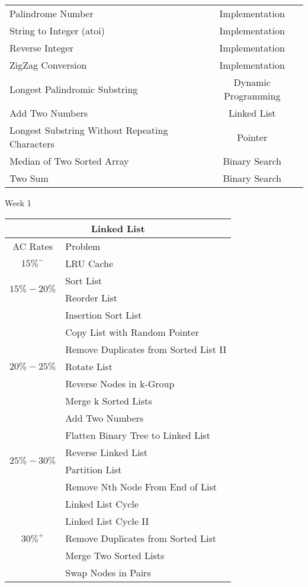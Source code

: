\documentclass[paper=a4, fontsize=11pt]{scrartcl} %
\begin{document}
\begin{center}
\begin{longtable}{|l|c|}
    Palindrome Number   &   Implementation \\
    String to Integer (atoi)    &   Implementation  \\
    Reverse Integer &   Implementation \\
    ZigZag Conversion   &  Implementation  \\
    Longest Palindromic Substring   &   Dynamic Programming \\
    Add Two Numbers &   Linked List \\
    Longest Substring Without Repeating Characters  &   Pointer  \\
    Median of Two Sorted Array  &   Binary Search   \\
    Two Sum &      Binary Search    \\
    \hline

  \end{longtable}

  \pagebreak

  \begin{center}
    Week 1
  \end{center}
  \vspace{5mm}

  \begin{tabular}{|c|l|}
      \hline
      \multicolumn{2}{|c|}{Linked List} \\
      \hline
      AC Rates      &   Problem     \\
      \hline
      \multirow{1}{*}{$15\%^-$}  &   LRU Cache    \\
      \hline
      \multirow{2}{*}{$15\%-20\%$}  &   Sort List    \\
          & Reorder List    \\
      \hline
      \multirow{7}{*}{$20\%-25\%$}  &   Insertion Sort List    \\
          & Copy List with Random Pointer    \\
          & Remove Duplicates from Sorted List II \\
          & Rotate List \\
          & Reverse Nodes in k-Group    \\
          & Merge k Sorted Lists \\
          & Add Two Numbers \\
      \hline
      \multirow{4}{*}{$25\%-30\%$}  &   Flatten Binary Tree to Linked List    \\
          & Reverse Linked List \\
          & Partition List  \\
          & Remove Nth Node From End of List \\
      \hline
      \multirow{5}{*}{$30\%^+$}  &   Linked List Cycle    \\
          & Linked List Cycle II    \\
          & Remove Duplicates from Sorted List \\
          & Merge Two Sorted Lists \\
          & Swap Nodes in Pairs \\
      \hline
  \end{tabular}


\end{center}
\end{document}
